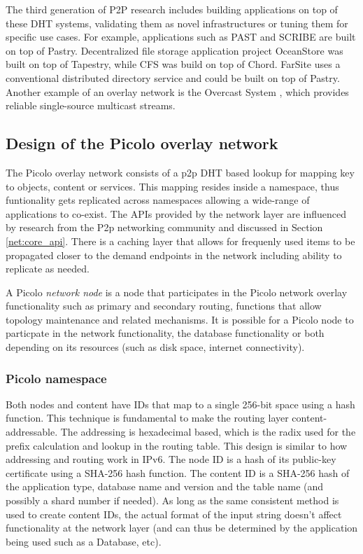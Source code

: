 The third generation of P2P research includes building applications on top of these DHT systems, validating them as
novel infrastructures or tuning them for specific use cases. For example, applications such as PAST \cite{past} and
SCRIBE \cite{scribe} are built on top of Pastry. Decentralized file storage application project OceanStore \cite{oceanstore} was built
on top of Tapestry, while CFS \cite{cfs} was build on top of Chord. FarSite \cite{farsite} uses a conventional
distributed directory service and could be built on top of Pastry. Another example of an overlay network is the Overcast
System \cite{overcast}, which provides reliable single-source multicast streams.

\subsection{Design of the Picolo overlay network}
\label{net:design}

The Picolo overlay network consists of a p2p DHT based lookup for mapping key to objects, content or services. This
mapping resides inside a namespace, thus funtionality gets replicated across namespaces allowing a wide-range of
applications to co-exist. The APIs provided by the network layer are influenced by research from the P2p networking
community and discussed in Section \ref{net:core_api}.  There is a caching layer that allows for frequenly used items to
be propagated closer to the demand endpoints in the network including ability to replicate as needed.

A Picolo {\em network node} is a node that participates in the Picolo network overlay functionality such as primary and
secondary routing, functions that allow topology maintenance and related mechanisms. It is possible for a Picolo node to
particpate in the network functionality, the database functionality or both depending on its resources (such as disk
space, internet connectivity).

\subsubsection{Picolo namespace} 
\label{net:namespace}

Both nodes and content have IDs that map to a single 256-bit space using a hash function. This technique is fundamental
to make the routing layer content-addressable. The addressing is hexadecimal based, which is the radix used for the
prefix calculation and lookup in the routing table. This design is similar to how addressing and routing work in IPv6.
The node ID is a hash of its public-key certificate using a SHA-256 hash function. The content ID is a SHA-256 hash of
the application type, database name and version and the table name (and possibly a shard number if needed). As long as
the same consistent method is used to create content IDs, the actual format of the input string doesn't affect
functionality at the network layer (and can thus be determined by the application being used such as a Database, etc).

